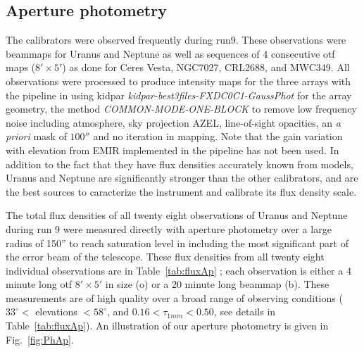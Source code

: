 

\subsection{Aperture photometry}

The calibrators were observed frequently during run9. These observations were beammaps for Uranus and Neptune
as well as  sequences of 4 consecutive
otf maps ($8' \times 5'$) as done for Ceres Vesta, NGC7027, CRL2688, and MWC349. All observations were processed 
to produce intensity maps for the three arrays with the pipeline  in
using kidpar
{\it kidpar-best3files-FXDC0C1-GaussPhot} for the array geometry,
the method {\it COMMON-MODE-ONE-BLOCK}  to remove
 low frequency noise including atmosphere,
sky projection AZEL, line-of-sight opacities, an {\it a priori} mask of $100''$ and no iteration in mapping.
Note that the gain variation with elevation from EMIR implemented in the pipeline has not been used. 
In addition to the fact that they  have flux densities accurately known from models,
Uranus and Neptune are significantly stronger than the other calibrators, and  are the best sources to caracterize the
instrument and calibrate its flux density  scale.

The total flux densities of all twenty eight observations of Uranus and Neptune during run 9 were
measured directly with aperture photometry over a large radius of 150'' to reach saturation level in including the most significant part of the
error beam of the telescope. These flux densities from all twenty eight individual observations are in Table~\ref{tab:fluxAp} ; each observation
is either a 4 minute long  otf $8' \times 5'$ in size (o) or  a 20 minute long beammap (b). These measurements are of high quality
over a broad range of observing conditions
($33^{\circ}<$ elevations $<58^{\circ}$, and   $0.16 < \tau_{1mm} < 0.50$, see details in  Table~\ref{tab:fluxAp}). An illustration of
our aperture photometry is given in Fig.~\ref{fig:PhAp}.

